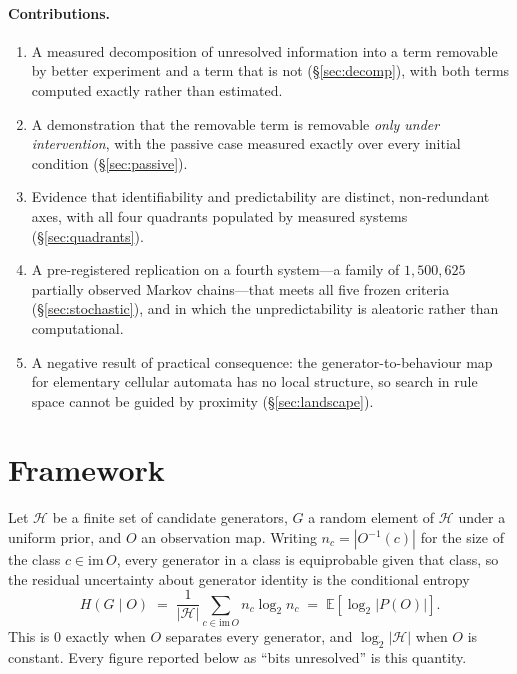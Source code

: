 \documentclass[11pt]{article}
\newcommand{\HH}{\ensuremath{\mathcal{H}}}
\begin{document}
\paragraph{Contributions.}
\begin{enumerate}
\item A measured decomposition of unresolved information into a term removable by
better experiment and a term that is not (\S\ref{sec:decomp}), with both terms
computed exactly rather than estimated.
\item A demonstration that the removable term is removable \emph{only under
intervention}, with the passive case measured exactly over every initial condition
(\S\ref{sec:passive}).
\item Evidence that identifiability and predictability are distinct, non-redundant
axes, with all four quadrants populated by measured systems (\S\ref{sec:quadrants}).
\item A pre-registered replication on a fourth system---a family of $1{,}500{,}625$
partially observed Markov chains---that meets all five frozen criteria
(\S\ref{sec:stochastic}), and in which the unpredictability is aleatoric rather than
computational.
\item A negative result of practical consequence: the generator-to-behaviour map for
elementary cellular automata has no local structure, so search in rule space cannot be
guided by proximity (\S\ref{sec:landscape}).
\end{enumerate}

\section{Framework}\label{sec:framework}

Let $\HH$ be a finite set of candidate generators, $G$ a random element of $\HH$ under
a uniform prior, and $O$ an observation map. Writing $n_c = |O^{-1}(c)|$ for the size of
the class $c \in \mathrm{im}\,O$, every generator in a class is equiprobable given that
class, so the residual uncertainty about generator identity is the conditional entropy
\begin{equation}\label{eq:hgo}
  H(G \mid O) \;=\; \frac{1}{|\HH|}\sum_{c \in \mathrm{im}\,O} n_c \log_2 n_c
  \;=\; \mathbb{E}\!\left[\log_2 |P(O)|\right].
\end{equation}
This is $0$ exactly when $O$ separates every generator, and $\log_2|\HH|$ when $O$ is
constant. Every figure reported below as ``bits unresolved'' is this quantity.
\end{document}
